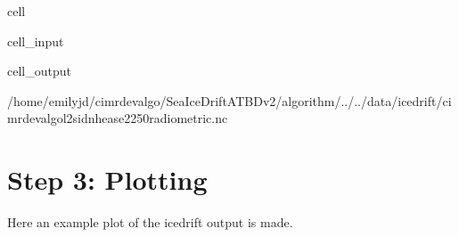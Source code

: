 \documentclass[letterpaper,10pt,english]{jupyterBook}
\begin{document}
\begin{sphinxuseclass}{cell}
\begin{sphinxVerbatimInput}
\begin{sphinxuseclass}{cell_input}
\begin{sphinxVerbatim}[commandchars=\\\{\}]
  

   
   
 
\end{sphinxVerbatim}

\end{sphinxuseclass}\end{sphinxVerbatimInput}
\begin{sphinxVerbatimOutput}

\begin{sphinxuseclass}{cell_output}
\begin{sphinxVerbatim}[commandchars=\\\{\}]
/home/emilyjd/cimr\PYGZhy{}devalgo/SeaIceDrift\PYGZus{}ATBD\PYGZus{}v2/algorithm/../../data/icedrift/cimr\PYGZus{}devalgo\PYGZus{}l2\PYGZus{}sid\PYGZus{}nh\PYGZhy{}ease2\PYGZhy{}250\PYGZus{}radiometric.nc
\end{sphinxVerbatim}

\end{sphinxuseclass}\end{sphinxVerbatimOutput}

\end{sphinxuseclass}

\section{Step 3: Plotting}
\label{\detokenize{CIMR_L2_Sea_Ice_Drift_algorithm:step-3-plotting}}
\sphinxAtStartPar
Here an example plot of the icedrift output is made.
\end{document}
